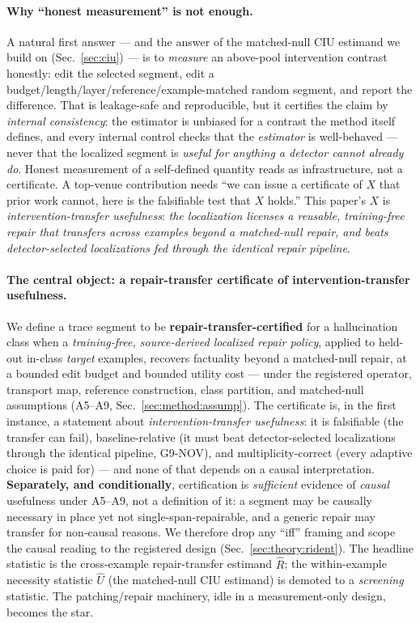 \documentclass[11pt]{article}
\theoremstyle{plain}
\theoremstyle{definition}
\newcommand{\Uhat}{\widehat{U}}
\newcommand{\Rhat}{\widehat{R}}
\begin{document}
\paragraph{Why ``honest measurement'' is not enough.} A natural first answer ---
and the answer of the matched-null CIU estimand we build on (Sec.~\ref{sec:ciu})
--- is to \emph{measure} an above-pool intervention contrast honestly: edit the
selected segment, edit a budget/length/layer/reference/example-matched random
segment, and report the difference. That is leakage-safe and reproducible, but it
certifies the claim by \emph{internal consistency}: the estimator is unbiased for a
contrast the method itself defines, and every internal control checks that the
\emph{estimator} is well-behaved --- never that the localized segment is
\emph{useful for anything a detector cannot already do}. Honest measurement of a
self-defined quantity reads as infrastructure, not a certificate. A top-venue
contribution needs ``we can issue a certificate of $X$ that prior work cannot, here
is the falsifiable test that $X$ holds.'' This paper's $X$ is
\emph{intervention-transfer usefulness}: \emph{the localization licenses a
reusable, training-free repair that transfers across examples beyond a matched-null
repair, and beats detector-selected localizations fed through the identical repair
pipeline}.

\paragraph{The central object: a repair-transfer certificate of
intervention-transfer usefulness.} We define a trace segment to be
\textbf{repair-transfer-certified} for a hallucination class when a
\emph{training-free, source-derived localized repair policy}, applied to held-out
in-class \emph{target} examples, recovers factuality beyond a matched-null repair,
at a bounded edit budget and bounded utility cost --- under the registered
operator, transport map, reference construction, class partition, and matched-null
assumptions (A5--A9, Sec.~\ref{sec:method:assump}). The certificate is, in the
first instance, a statement about \emph{intervention-transfer usefulness}: it is
falsifiable (the transfer can fail), baseline-relative (it must beat
detector-selected localizations through the identical pipeline, G9-NOV), and
multiplicity-correct (every adaptive choice is paid for) --- and none of that
depends on a causal interpretation. \textbf{Separately, and conditionally},
certification is \emph{sufficient} evidence of \emph{causal} usefulness under
A5--A9, not a definition of it: a segment may be causally necessary in place yet
not single-span-repairable, and a generic repair may transfer for non-causal
reasons. We therefore drop any ``iff'' framing and scope the causal reading to the
registered design (Sec.~\ref{sec:theory:rident}). The headline statistic is the
cross-example repair-transfer estimand $\Rhat$; the within-example necessity
statistic $\Uhat$ (the matched-null CIU estimand) is demoted to a \emph{screening}
statistic. The patching/repair machinery, idle in a measurement-only design,
becomes the star.
\end{document}
